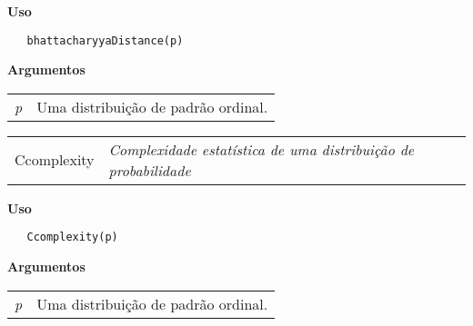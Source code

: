\vspace{-0.5cm}

\hrulefill  

\vspace{0.5cm}

\textbf{Uso}

\begin{lstlisting}
   bhattacharyyaDistance(p)
\end{lstlisting}

\vspace{0.5cm}

\textbf{Argumentos}

\begin{table}[!ht]
\begin{center}
\begin{tabularx}{\textwidth}{X X}
\hspace{0.5cm} \textit{p} & Uma distribuição de padrão ordinal.\\
\end{tabularx}
\end{center}
\end{table} 

\hrulefill   

\begin{table}[!ht]
\begin{center}
\begin{tabularx}{\textwidth}{ X X}
\hspace{0.5cm} Ccomplexity & \textit{Complexidade estatística de uma distribuição de probabilidade}\\
\end{tabularx}
\end{center}
\end{table} 

\vspace{-0.5cm}

\hrulefill  

\vspace{0.5cm}

\textbf{Uso}

\begin{lstlisting}
   Ccomplexity(p)
\end{lstlisting}

\vspace{0.5cm}

\textbf{Argumentos}

\begin{table}[!ht]
\begin{center}
\begin{tabularx}{\textwidth}{X X}
\hspace{0.5cm} \textit{p} & Uma distribuição de padrão ordinal.\\
\end{tabularx}
\end{center}
\end{table} 

